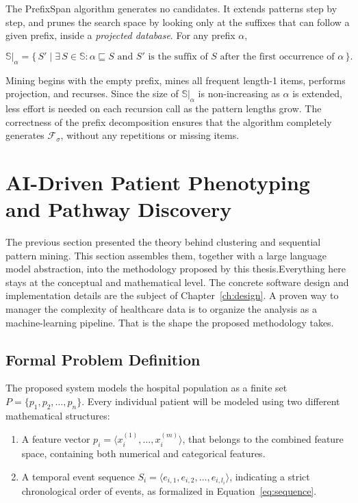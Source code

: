 The PrefixSpan algorithm \cite{pei2001} generates no candidates. It extends patterns step by step, and prunes the search space by looking only at the suffixes that can follow a given prefix, inside a \emph{projected database}. For any prefix $\alpha$,

\begin{equation}
    \mathbb{S}|_\alpha = \bigl\{\, S' \mid \exists\, S \in \mathbb{S}: \alpha \sqsubseteq S \text{ and } S' \text{ is the suffix of } S \text{ after the first occurrence of } \alpha \,\bigr\}.
    \label{eq:projection}
\end{equation}

Mining begins with the empty prefix, mines all frequent length-1 items, performs projection, and recurses. Since the size of $\mathbb{S}|_\alpha$ is non-increasing as $\alpha$ is extended, less effort is needed on each recursion call as the pattern lengths grow. The correctness of the prefix decomposition ensures that the algorithm completely generates $\mathcal{F}_\sigma$, without any repetitions or missing items.

\section{AI-Driven Patient Phenotyping and Pathway Discovery}

The previous section presented the theory behind clustering and sequential pattern mining. This section assembles them, together with a large language model abstraction, into the methodology proposed by this thesis.Everything here stays at the conceptual and mathematical level. The concrete software design and implementation details are the subject of Chapter~\ref{ch:design}. A proven way to manager the complexity of healthcare data is to organize the analysis as a machine-learning pipeline. That is the shape the proposed methodology takes.

\subsection{Formal Problem Definition}

The proposed system models the hospital population as a finite set $P = \{p_1, p_2, \dots, p_n\}$. Every individual patient will be modeled using two different mathematical structures:
\begin{enumerate}
    \item A feature vector $p_i = \langle x_i^{(1)}, \dots, x_i^{(m)} \rangle$, that belongs to the combined feature space, containing both numerical and categorical features.
    \item A temporal event sequence $S_i = \langle e_{i,1}, e_{i,2}, \dots, e_{i,l_i} \rangle$, indicating a strict chronological order of events, as formalized in Equation~\eqref{eq:sequence}.
\end{enumerate}

